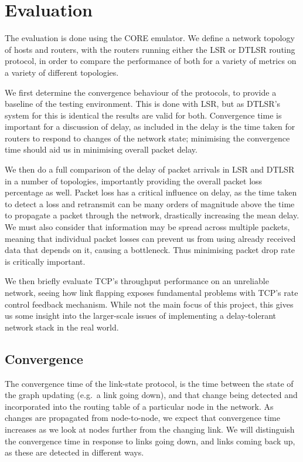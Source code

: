 \documentclass[withindex,glossary,openany]{cam-thesis}
\begin{document}
\chapter{Evaluation}
\label{chapter:evaluation}

The evaluation is done using the CORE emulator. We define a network topology of hosts and routers, with the routers running either the LSR or DTLSR routing protocol, in order to compare the performance of both for a variety of metrics on a variety of different topologies.

We first determine the convergence behaviour of the protocols, to provide a baseline of the testing environment. This is done with LSR, but as DTLSR's system for this is identical the results are valid for both. Convergence time is important for a discussion of delay, as included in the delay is the time taken for routers to respond to changes of the network state; minimising the convergence time should aid us in minimising overall packet delay.

We then do a full comparison of the delay of packet arrivals in LSR and DTLSR in a number of topologies, importantly providing the overall packet loss percentage as well. Packet loss has a critical influence on delay, as the time taken to detect a loss and retransmit can be many orders of magnitude above the time to propagate a packet through the network, drastically increasing the mean delay. We must also consider that information may be spread across multiple packets, meaning that individual packet losses can prevent us from using already received data that depends on it, causing a bottleneck. Thus minimising packet drop rate is critically important.

We then briefly evaluate TCP's throughput performance on an unreliable network, seeing how link flapping exposes fundamental problems with TCP's rate control feedback mechanism. While not the main focus of this project, this gives us some insight into the larger-scale issues of implementing a delay-tolerant network stack in the real world.

\section{Convergence}

The convergence time of the link-state protocol, is the time between the state of the graph updating (e.g.\ a link going down), and that change being detected and incorporated into the routing table of a particular node in the network. As changes are propagated from node-to-node, we expect that convergence time increases as we look at nodes further from the changing link. We will distinguish the convergence time in response to links going down, and links coming back up, as these are detected in different ways. 
\end{document}
